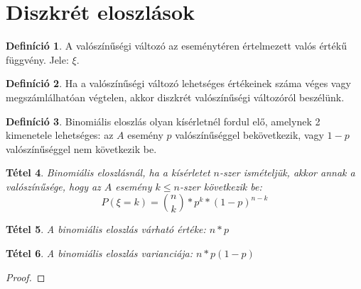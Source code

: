 \documentclass[twoside,12pt]{report}
\newtheorem{theorem}{Tétel}[section]
\theoremstyle{definition}
\newtheorem{definition}[theorem]{Definíció}
\begin{document}
\section{Diszkrét eloszlások}
	\begin{definition}
		A valószínűségi változó az eseménytéren értelmezett valós értékű függvény. Jele: $\xi$.
	\end{definition}
	\begin{definition}
		Ha a valószínűségi változó lehetséges értékeinek száma véges vagy megszámlálhatóan végtelen, akkor diszkrét valószínűségi változóról beszélünk.
	\end{definition}
	\begin{definition}
		Binomiális eloszlás olyan kísérletnél fordul elő, amelynek 2 kimenetele lehetséges: az $A$ esemény $p$ valószínűséggel bekövetkezik, vagy $1-p$ valószínűséggel nem következik be.
	\end{definition}
	\begin{theorem}
		Binomiális eloszlásnál, ha a kísérletet $n$-szer ismételjük, akkor annak a valószínűsége, hogy az $A$ esemény $k\le n$-szer következik be:
		\begin{equation*}
			P(\xi=k)=\binom{n}{k}*p^k*(1-p)^{n-k}
		\end{equation*}
	\end{theorem}
	\begin{theorem}
		A binomiális eloszlás várható értéke: $n*p$
	\end{theorem}
	\begin{theorem}
		A binomiális eloszlás varianciája: $n*p(1-p)$
	\end{theorem}
	\begin{proof}
		
	\end{proof}
\end{document}

